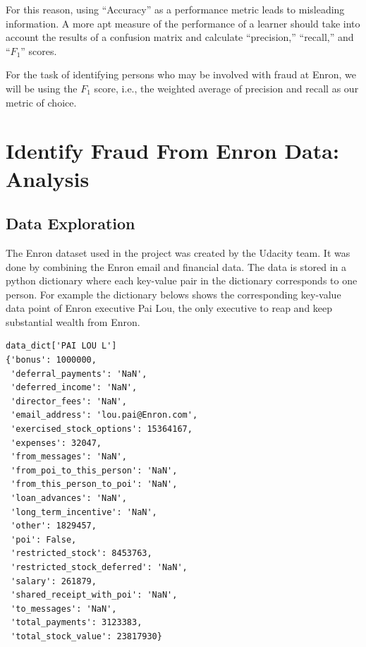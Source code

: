 \documentclass[twoside,openright,titlepage,numbers=noenddot,headinclude,%
               footinclude=true,cleardoublepage=empty,abstractoff,BCOR=5mm,%
               paper=a4,fontsize=11pt,ngerman,american]{scrreprt}
\numberwithin{theorem}{chapter}
\numberwithin{definition}{chapter}
\numberwithin{algorithm}{chapter}
\numberwithin{figure}{chapter}
\numberwithin{table}{chapter}
\numberwithin{equation}{chapter}
\begin{document}
For this reason, using ``Accuracy'' as a performance metric leads to misleading information. A more apt measure of the performance of a learner should take into account the results of a confusion matrix and  calculate ``precision,'' ``recall,'' and ``$F_1$'' scores. 

For the task of identifying persons who may be involved with fraud at Enron, we will be using the $F_1$ score, i.e., the weighted average of precision and recall as our metric of choice.



\chapter*{Identify Fraud From Enron Data: Analysis}

\section*{Data Exploration}

The Enron dataset used in the project was created by the Udacity team. It was done by combining the Enron email and financial data. The data is stored in a python dictionary where each key-value pair in the dictionary corresponds to one person. For example the dictionary belows shows the corresponding key-value data point of Enron executive Pai Lou, the only executive to reap and keep substantial wealth from Enron. 

\begin{verbatim}
data_dict['PAI LOU L']
{'bonus': 1000000,
 'deferral_payments': 'NaN',
 'deferred_income': 'NaN',
 'director_fees': 'NaN',
 'email_address': 'lou.pai@Enron.com',
 'exercised_stock_options': 15364167,
 'expenses': 32047,
 'from_messages': 'NaN',
 'from_poi_to_this_person': 'NaN',
 'from_this_person_to_poi': 'NaN',
 'loan_advances': 'NaN',
 'long_term_incentive': 'NaN',
 'other': 1829457,
 'poi': False,
 'restricted_stock': 8453763,
 'restricted_stock_deferred': 'NaN',
 'salary': 261879,
 'shared_receipt_with_poi': 'NaN',
 'to_messages': 'NaN',
 'total_payments': 3123383,
 'total_stock_value': 23817930}
\end{verbatim}
\end{document}
